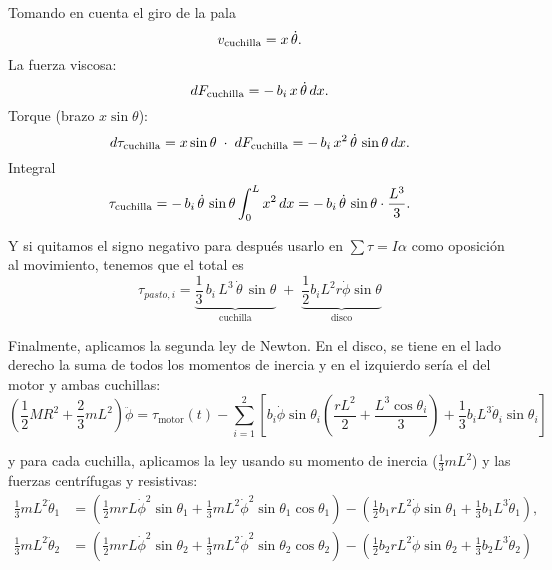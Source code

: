 \documentclass[stu,12pt,floatsintext,draftfirst,spanish]{report}
\begin{document}
	
	Tomando en cuenta el giro de la pala 
	\begin{equation}
	v_{\rm cuchilla} = x\,\dot\theta.
	\end{equation}
	La fuerza viscosa: 
	\begin{equation}
	dF_{\rm cuchilla} = -\,b_i\,x\,\dot\theta\,dx.
	\end{equation}
	Torque (brazo $x\sin\theta$):  
	\begin{equation}
	d\tau_{\rm cuchilla}
	= x\sin\theta\;\cdot\; dF_{\rm cuchilla}
	= -\,b_i\,x^2\,\dot\theta\,\sin\theta\,dx.
	\end{equation}
	Integral  
	\begin{equation}
	\tau_{\rm cuchilla}
	= -\,b_i\,\dot\theta\,\sin\theta
	\int_0^L x^2\,dx
	= -\,b_i\,\dot\theta\,\sin\theta
	\cdot \frac{L^3}{3}.
	\end{equation}
	

	Y si quitamos el signo negativo para después usarlo en \(\sum\tau=I\alpha\) como oposición al movimiento, tenemos que el total es
	\begin{equation}
	\tau_{pasto,i}
	= 
	\underbrace{\frac{1}{3}\,b_i\,L^3\,\dot\theta\,\sin\theta}_{\displaystyle\text{cuchilla}}
	\;+\;
	\underbrace{\frac12b_iL^2r\dot\phi\sin\theta}_{\displaystyle\text{disco}}
	\end{equation}

	
	Finalmente, aplicamos la segunda ley de Newton. En el disco, se tiene en el lado derecho la suma de todos los momentos de inercia y en el izquierdo sería el del motor y ambas cuchillas:
	\begin{equation} \boxed{(\frac{1}{2}MR^2 + \frac{2}{3}mL^2)\ddot{\phi} = \tau_{\text{motor}}(t) - \sum_{i=1}^{2} [b_i \dot{\phi} \sin{\theta_i} \left(\frac{rL^2}{2} + \frac{L^3\cos{\theta_i}}{3}\right) + \frac{1}{3}b_i L^3 \dot{\theta}_i \sin{\theta_i}]} \end{equation}
	
	y para cada cuchilla, aplicamos la ley usando su momento de inercia ($\frac{1}{3} m L^2$) y las fuerzas centrífugas y resistivas:
	\begin{equation}
	\boxed{
	\begin{aligned}
		\frac{1}{3} m L^2 \ddot{\theta}_1 &= \left( \frac{1}{2} m r L \dot{\phi}^2 \sin\theta_1 + \frac{1}{3} m L^2 \dot{\phi}^2 \sin\theta_1 \cos\theta_1 \right) - \left( \frac{1}{2} b_1 r L^2 \dot{\phi} \sin\theta_1 + \frac{1}{3} b_1 L^3 \dot{\theta}_1 \right), \\
		\frac{1}{3} m L^2 \ddot{\theta}_2 &= \left( \frac{1}{2} m r L \dot{\phi}^2 \sin\theta_2 + \frac{1}{3} m L^2 \dot{\phi}^2 \sin\theta_2 \cos\theta_2 \right) - \left( \frac{1}{2} b_2 r L^2 \dot{\phi} \sin\theta_2 + \frac{1}{3} b_2 L^3 \dot{\theta}_2 \right)
	\end{aligned}}
	\end{equation}
	
\end{document}
